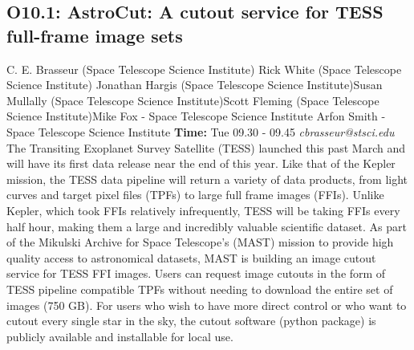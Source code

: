 \documentclass{report}
\begin{document}
\subsection*{O10.1: AstroCut: A cutout service for TESS full-frame image sets}
\bigskip
C. E. Brasseur (Space Telescope Science Institute) \newline Rick White (Space Telescope Science Institute) \newline  Jonathan Hargis (Space Telescope Science Institute)\newline  Susan Mullally (Space Telescope Science Institute)\newline Scott Fleming (Space Telescope Science Institute)\newline  Mike Fox - Space Telescope Science Institute
Arfon Smith - Space Telescope Science Institute\newline\newline
{\bf Time:} Tue 09.30 - 09.45\newline
\newline
{\it cbrasseur@stsci.edu}\newline
\newline\newline
The Transiting Exoplanet Survey Satellite (TESS) launched this past March and will have its first data release near the end of this year. Like that of the Kepler mission, the TESS data pipeline will return a variety of data products, from light curves and target pixel files (TPFs) to large full frame images (FFIs). Unlike Kepler, which took FFIs relatively infrequently, TESS will be taking FFIs every half hour, making them a large and incredibly valuable scientific dataset. As part of the Mikulski Archive for Space Telescope's (MAST) mission to provide high quality access to astronomical datasets, MAST is building an image cutout service for TESS FFI images.  Users can request image cutouts in the form of TESS pipeline compatible TPFs without needing to download the entire set of images (750 GB). For users who wish to have more direct control or who want to cutout every single star in the sky, the cutout software (python package) is publicly available and installable for local use.
\end{document}
